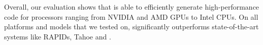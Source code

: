 
Overall, our evaluation shows that \Treebeard{} is able to efficiently generate 
high-performance code for processors ranging from NVIDIA and AMD GPUs to Intel CPUs.
On all platforms and models that we tested on, \Treebeard{} significantly outperforms
state-of-the-art systems like RAPIDs, Tahoe and \TreebeardOLD{}.